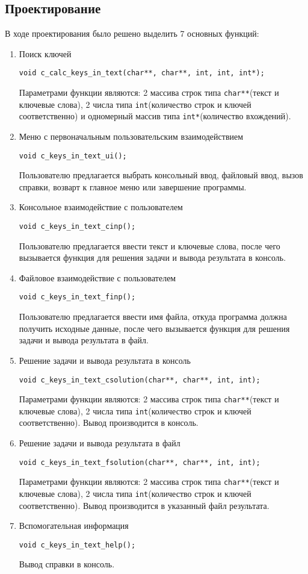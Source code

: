 \documentclass[12pt,a4paper]{report}
\begin{document}
\subsection{Проектирование}
\hspace{\parindent}В ходе проектирования было решено выделить 7 основных функций:
\begin{enumerate}
 	\item Поиск ключей
 	
 	\verb+void c_calc_keys_in_text(char**, char**, int, int, int*);+
 	
	Параметрами функции являются: 2 массива строк типа \verb+char**+(текст и ключевые слова), 2 числа типа \verb+int+(количество строк и ключей соответственно) и одномерный массив типа \verb+int*+(количество вхождений).
		 
		 
	\item Меню с первоначальным пользовательским взаимодействием
	
	\verb+void c_keys_in_text_ui();+
	
	Пользователю предлагается выбрать консольный ввод, файловый ввод, вызов справки, возварт к главное меню или завершение программы. 	 
		 
	\item Консольное взаимодействие с пользователем
	
	\verb+void c_keys_in_text_cinp();+

	Пользователю предлагается ввести текст и ключевые слова, после чего вызывается функция для решения задачи и вывода результата в консоль.
	
	\item Файловое взаимодействие с пользователем
	
	\verb+void c_keys_in_text_finp();+

	Пользователю предлагается ввести имя файла, откуда программа должна получить исходные данные, после чего вызывается функция для решения задачи и вывода результата в файл.
	
	\item Решение задачи и вывода результата в консоль
	
	\verb+void c_keys_in_text_csolution(char**, char**, int, int);+

	Параметрами функции являются: 2 массива строк типа \verb+char**+(текст и ключевые слова), 2 числа типа \verb+int+(количество строк и ключей соответственно). Вывод производится в консоль.
	
	\item Решение задачи и вывода результата в файл
	
	\verb+void c_keys_in_text_fsolution(char**, char**, int, int);+

	Параметрами функции являются: 2 массива строк типа \verb+char**+(текст и ключевые слова), 2 числа типа \verb+int+(количество строк и ключей соответственно). Вывод производится в указанный файл результата.
	
	
	\item Вспомогательная информация
	
	\verb+void c_keys_in_text_help();+
	
	Вывод справки в консоль.
\end{enumerate}
\end{document}
